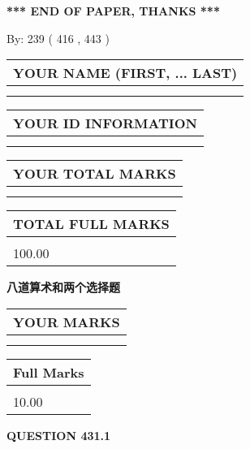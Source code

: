 \documentclass{ctexart}
\begin{document}
   
 \vspace{0.2in}
 
   
   
   
   
\vspace{1.0in} 
{\textbf{\large{ *** END OF PAPER, THANKS *** }}} 
   
   
\hspace{1.0in} By: 
 239 ( 416 ,  443 )
   
   
   
   
\newpage 
\setcounter{page}{ 
   431001 } 
   
   
   
   
\noindent\begin{tabular}{|l|}
\hline
YOUR NAME (FIRST, ... LAST)  \\
\hline
 \\ 
 \\ 
\hline
\end{tabular}
\hspace{0.05in} \begin{tabular}{|l|}
\hline
 YOUR   ID   INFORMATION  \\
\hline
 \\ 
 \\ 
\hline
\end{tabular}
   
   
\vspace{0.2in}\noindent\begin{tabular}{|l|}
\hline
YOUR TOTAL MARKS  \\
\hline
 \\ 
 \\ 
\hline
\end{tabular}
\hspace{0.05in} \begin{tabular}{|l|}
\hline
TOTAL FULL MARKS  \\
\hline
 \\ 
100.00 \\
\hline
\end{tabular}
   
   
 \vspace{0.2in}
{\LARGE {\textbf{ 八道算术和两个选择题}}}
   
   
  
\vspace{0.2in}
  
\noindent\begin{tabular}{|l|}
\hline
 YOUR MARKS  \\
\hline
 \\ 
 \\ 
\hline
\end{tabular}
\hspace{0.05in} \begin{tabular}{|l|}
\hline
 Full Marks  \\
\hline
 \\ 
10.00 \\
\hline
\end{tabular}
{\textbf{\Large{QUESTION
431.1 
}}}
  
\end{document}

